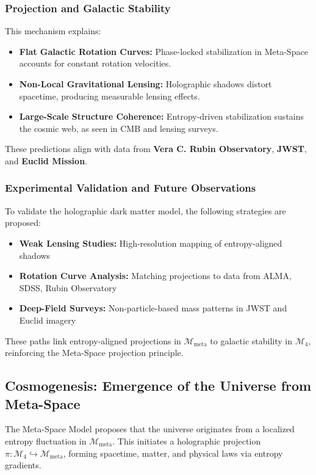 \documentclass[10.5pt,a4paper]{article}
\begin{document}
\subsubsection{Projection and Galactic Stability}

This mechanism explains:
\begin{itemize}
    \item \textbf{Flat Galactic Rotation Curves:} Phase-locked stabilization in Meta-Space accounts for constant rotation velocities.
    \item \textbf{Non-Local Gravitational Lensing:} Holographic shadows distort spacetime, producing measurable lensing effects.
    \item \textbf{Large-Scale Structure Coherence:} Entropy-driven stabilization sustains the cosmic web, as seen in CMB and lensing surveys.
\end{itemize}

These predictions align with data from \textbf{Vera C. Rubin Observatory}, \textbf{JWST}, and \textbf{Euclid Mission}.

\subsubsection{Experimental Validation and Future Observations}

To validate the holographic dark matter model, the following strategies are proposed:
\begin{itemize}
    \item \textbf{Weak Lensing Studies:} High-resolution mapping of entropy-aligned shadows
    \item \textbf{Rotation Curve Analysis:} Matching projections to data from ALMA, SDSS, Rubin Observatory
    \item \textbf{Deep-Field Surveys:} Non-particle-based mass patterns in JWST and Euclid imagery
\end{itemize}

These paths link entropy-aligned projections in \(\mathcal{M}_{\text{meta}}\) to galactic stability in \(\mathcal{M}_4\), reinforcing the Meta-Space projection principle.

\subsection{Cosmogenesis: Emergence of the Universe from Meta-Space}

The Meta-Space Model proposes that the universe originates from a localized entropy fluctuation in \(\mathcal{M}_{\text{meta}}\). This initiates a holographic projection \(\pi: \mathcal{M}_4 \hookrightarrow \mathcal{M}_{\text{meta}}\), forming spacetime, matter, and physical laws via entropy gradients.
\end{document}
